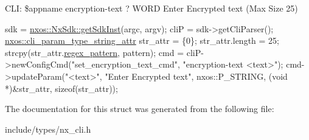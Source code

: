 C\+LI\+: \$appname encryption-\/text ? W\+O\+RD Enter Encrypted text (Max Size 25) ~\newline
 
\begin{DoxyCode}
sdk = \mbox{\hyperlink{classnxos_1_1_nx_sdk_a5050e2d26c40744b4fc7862068a83f39}{nxos::NxSdk::getSdkInst}}(argc, argv);
cliP = sdk->getCliParser();
\mbox{\hyperlink{structnxos_1_1cli__param__type__string__attr__}{nxos::cli\_param\_type\_string\_attr}} str\_attr = \{0\};
str\_attr.length = 25;
strcpy(str\_attr.\mbox{\hyperlink{structnxos_1_1cli__param__type__string__attr___a2a547a1318e243011f100535aebf0a49}{regex\_pattern}}, pattern);
cmd = cliP->newConfigCmd(\textcolor{stringliteral}{"set\_encryption\_text\_cmd"},
                         \textcolor{stringliteral}{"encryption-text <text>"});
cmd->updateParam(\textcolor{stringliteral}{"<text>"}, \textcolor{stringliteral}{"Enter Encrypted text"}, nxos::P\_STRING,
                 (\textcolor{keywordtype}{void} *)&str\_attr, \textcolor{keyword}{sizeof}(str\_attr));
\end{DoxyCode}



 

The documentation for this struct was generated from the following file\+:\begin{DoxyCompactItemize}
\item 
include/types/nx\+\_\+cli.\+h\end{DoxyCompactItemize}
